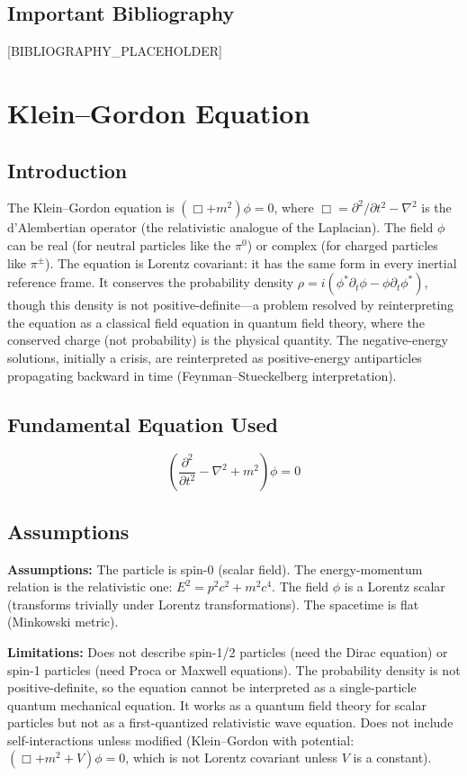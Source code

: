\documentclass[11pt,openright]{book}
\begin{document}
\section*{Important Bibliography}

[BIBLIOGRAPHY_PLACEHOLDER]


\chapter{Klein--Gordon Equation}

\section*{Introduction}

The Klein--Gordon equation is $(\Box + m^2)\phi = 0$, where $\Box = \partial^2/\partial t^2 - \nabla^2$ is the d'Alembertian operator (the relativistic analogue of the Laplacian). The field $\phi$ can be real (for neutral particles like the $\pi^0$) or complex (for charged particles like $\pi^\pm$). The equation is Lorentz covariant: it has the same form in every inertial reference frame. It conserves the probability density $\rho = i(\phi^*\partial_t\phi - \phi\partial_t\phi^*)$, though this density is not positive-definite---a problem resolved by reinterpreting the equation as a classical field equation in quantum field theory, where the conserved charge (not probability) is the physical quantity. The negative-energy solutions, initially a crisis, are reinterpreted as positive-energy antiparticles propagating backward in time (Feynman--Stueckelberg interpretation).
\section*{Fundamental Equation Used}

\[
\left(\frac{\partial^2}{\partial t^2}-\nabla^2+m^2\right)\phi=0
\]
\section*{Assumptions}

\textbf{Assumptions:} The particle is spin-0 (scalar field). The energy-momentum relation is the relativistic one: $E^2 = p^2c^2 + m^2c^4$. The field $\phi$ is a Lorentz scalar (transforms trivially under Lorentz transformations). The spacetime is flat (Minkowski metric).


\textbf{Limitations:} Does not describe spin-1/2 particles (need the Dirac equation) or spin-1 particles (need Proca or Maxwell equations). The probability density is not positive-definite, so the equation cannot be interpreted as a single-particle quantum mechanical equation. It works as a quantum field theory for scalar particles but not as a first-quantized relativistic wave equation. Does not include self-interactions unless modified (Klein--Gordon with potential: $(\Box + m^2 + V)\phi = 0$, which is not Lorentz covariant unless $V$ is a constant).
\end{document}

